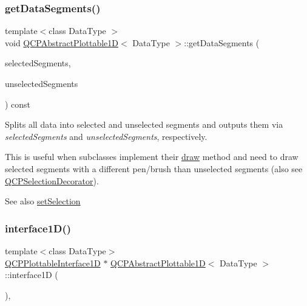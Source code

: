 \subsubsection{\texorpdfstring{get\+Data\+Segments()}{getDataSegments()}}
{\footnotesize\ttfamily template$<$class Data\+Type $>$ \\
void \hyperlink{class_q_c_p_abstract_plottable1_d}{Q\+C\+P\+Abstract\+Plottable1D}$<$ Data\+Type $>$\+::get\+Data\+Segments (\begin{DoxyParamCaption}\item[{Q\+List$<$ \hyperlink{class_q_c_p_data_range}{Q\+C\+P\+Data\+Range} $>$ \&}]{selected\+Segments,  }\item[{Q\+List$<$ \hyperlink{class_q_c_p_data_range}{Q\+C\+P\+Data\+Range} $>$ \&}]{unselected\+Segments }\end{DoxyParamCaption}) const\hspace{0.3cm}{\ttfamily [protected]}}

Splits all data into selected and unselected segments and outputs them via {\itshape selected\+Segments} and {\itshape unselected\+Segments}, respectively.

This is useful when subclasses implement their \hyperlink{class_q_c_p_abstract_plottable_a453f676a5cee7bf846c5f0fa05ea84b3}{draw} method and need to draw selected segments with a different pen/brush than unselected segments (also see \hyperlink{class_q_c_p_selection_decorator}{Q\+C\+P\+Selection\+Decorator}).

\begin{DoxySeeAlso}{See also}
\hyperlink{class_q_c_p_abstract_plottable_a219bc5403a9d85d3129165ec3f5ae436}{set\+Selection} 
\end{DoxySeeAlso}
\mbox{\label{class_q_c_p_abstract_plottable1_d_ac58fb47bfe330f6931ed8e64326387d7}} 
\subsubsection{\texorpdfstring{interface1\+D()}{interface1D()}}
{\footnotesize\ttfamily template$<$class Data\+Type$>$ \\
\hyperlink{class_q_c_p_plottable_interface1_d}{Q\+C\+P\+Plottable\+Interface1D} $\ast$ \hyperlink{class_q_c_p_abstract_plottable1_d}{Q\+C\+P\+Abstract\+Plottable1D}$<$ Data\+Type $>$\+::interface1D (\begin{DoxyParamCaption}{ }\end{DoxyParamCaption})\hspace{0.3cm}{\ttfamily [inline]}, {\ttfamily [virtual]}}

